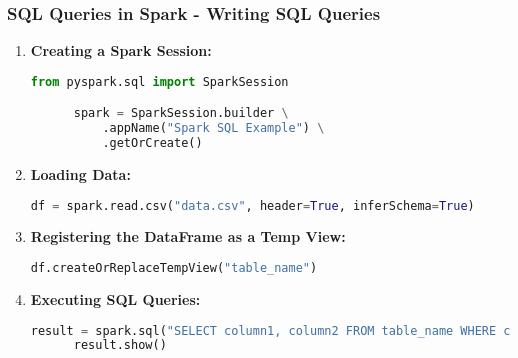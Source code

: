 \documentclass[aspectratio=169]{beamer}
\begin{document}
\begin{frame}[fragile]
  \frametitle{SQL Queries in Spark - Writing SQL Queries}
  \begin{enumerate}
    \item \textbf{Creating a Spark Session:} 
      \begin{lstlisting}[language=Python]
      from pyspark.sql import SparkSession

      spark = SparkSession.builder \
          .appName("Spark SQL Example") \
          .getOrCreate()
      \end{lstlisting}

    \item \textbf{Loading Data:} 
      \begin{lstlisting}[language=Python]
      df = spark.read.csv("data.csv", header=True, inferSchema=True)
      \end{lstlisting}

    \item \textbf{Registering the DataFrame as a Temp View:} 
      \begin{lstlisting}[language=Python]
      df.createOrReplaceTempView("table_name")
      \end{lstlisting}

    \item \textbf{Executing SQL Queries:} 
      \begin{lstlisting}[language=Python]
      result = spark.sql("SELECT column1, column2 FROM table_name WHERE column3 > 100")
      result.show()
      \end{lstlisting}
  \end{enumerate}
\end{frame}
\end{document}
